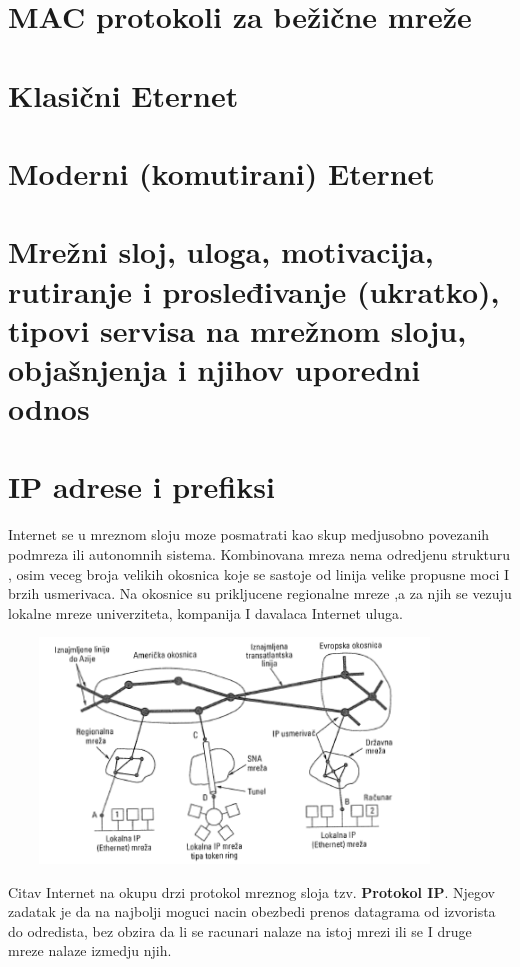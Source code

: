 \documentclass{article} %
\begin{document}
\section{MAC protokoli za bežične mreže}
\section{Klasični Eternet}
\section{Moderni (komutirani) Eternet}
\section{Mrežni sloj, uloga, motivacija, rutiranje i prosleđivanje (ukratko), tipovi servisa na mrežnom sloju, objašnjenja i njihov uporedni odnos}
\section{IP adrese i prefiksi}
Internet se u mreznom sloju moze posmatrati kao skup medjusobno povezanih podmreza ili autonomnih sistema. Kombinovana mreza nema odredjenu strukturu , osim veceg broja velikih okosnica koje se sastoje od linija velike propusne moci I brzih usmerivaca. Na okosnice su prikljucene regionalne mreze ,a za njih se vezuju lokalne mreze univerziteta, kompanija I davalaca Internet uluga.\\

\begin{center}
\includegraphics[width=12cm, height=6cm]{okosnica}\\
\end{center}
Citav Internet na okupu drzi protokol mreznog sloja tzv. \textbf{Protokol IP}. Njegov zadatak je da na najbolji moguci nacin obezbedi prenos datagrama od izvorista do odredista, bez obzira da li se racunari nalaze na istoj mrezi ili se I druge mreze nalaze izmedju njih.\\
\end{document}
